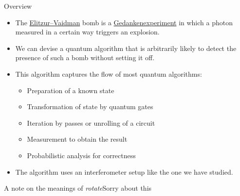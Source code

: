 
\begin{frame}{Overview}

\begin{itemize}
    \item The \href{https://en.wikipedia.org/wiki/Elitzur-Vaidman_bomb_tester}{Elitzur--Vaidman} bomb is a \href{https://en.wikipedia.org/wiki/Thought_experiment}{Gedankenexperiment} in which a photon measured in a certain way triggers an explosion.
    \item We can devise a quantum algorithm that is arbitrarily likely to detect the presence of such a bomb without setting it off.
    \item This algorithm captures the flow of most quantum algorithms:
    \begin{itemize}
        \item Preparation of a known state
        \item Transformation of state by quantum gates
        \item Iteration by passes or unrolling of a circuit
        \item Measurement to obtain the result
        \item Probabilistic analysis for correctness
    \end{itemize}
    \item The algorithm uses an interferometer setup like the one we have studied.
\end{itemize}
    
\end{frame}

\begin{frame}{A note on the meanings of \emph{rotate}}{Sorry about this}

    
\end{frame}

